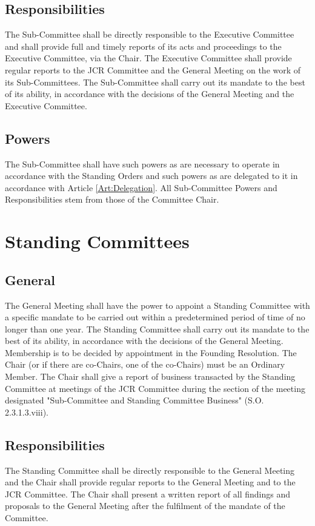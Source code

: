 \subsection{Responsibilities}
\npara The Sub-Committee shall be directly responsible to the Executive Committee and shall provide full and timely reports of its acts and proceedings to the Executive Committee, via the Chair.  The Executive Committee shall provide regular reports to the JCR Committee and the General Meeting on the work of its Sub-Committees.
\npara The Sub-Committee shall carry out its mandate to the best of its ability, in accordance with the decisions of the General Meeting and the Executive Committee.
\subsection{Powers}
\npara The Sub-Committee shall have such powers as are necessary to operate in accordance with the Standing Orders and such powers as are delegated to it in accordance with Article \ref{Art:Delegation}.
All Sub-Committee Powers and Responsibilities stem from those of the Committee Chair.
\section{Standing Committees}
\subsection{General}
\npara The General Meeting shall have the power to appoint a Standing Committee with a specific mandate to be carried out within a predetermined period of time of no longer than one year. 
\npara The Standing Committee shall carry out its mandate to the best of its ability, in accordance with the decisions of the General Meeting.
\npara Membership is to be decided by appointment in the Founding Resolution.  The Chair (or if there are co-Chairs, one of the co-Chairs) must be an Ordinary Member.
\npara The Chair shall give a report of business transacted by the Standing Committee at meetings of the JCR Committee during the section of the meeting designated "Sub-Committee and Standing Committee Business" (S.O. 2.3.1.3.viii).
\subsection{Responsibilities}
\npara The Standing Committee shall be directly responsible to the General Meeting and the Chair shall provide regular reports to the General Meeting and to the JCR Committee.
\npara The Chair shall present a written report of all findings and proposals to the General Meeting after the fulfilment of the mandate of the Committee.

